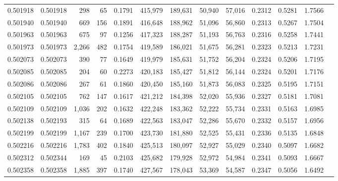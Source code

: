 \begin{tabular}{rrrrrrrrrrrrr}
0.501918 & 0.501918 &   298 &    65 &                                     0.1791 & 415,979 & 189,631 &  50,940 &  57,016 & 0.2312 & 0.5281 & 1.7566 \\
0.501940 & 0.501940 &   669 &   156 &                                     0.1891 & 416,648 & 188,962 &  51,096 &  56,860 & 0.2313 & 0.5267 & 1.7504 \\
0.501963 & 0.501963 &   675 &    97 &                                     0.1256 & 417,323 & 188,287 &  51,193 &  56,763 & 0.2316 & 0.5258 & 1.7441 \\
0.501973 & 0.501973 & 2,266 &   482 &                                     0.1754 & 419,589 & 186,021 &  51,675 &  56,281 & 0.2323 & 0.5213 & 1.7231 \\
0.502073 & 0.502073 &   390 &    77 &                                     0.1649 & 419,979 & 185,631 &  51,752 &  56,204 & 0.2324 & 0.5206 & 1.7195 \\
0.502085 & 0.502085 &   204 &    60 &                                     0.2273 & 420,183 & 185,427 &  51,812 &  56,144 & 0.2324 & 0.5201 & 1.7176 \\
0.502086 & 0.502086 &   267 &    61 &                                     0.1860 & 420,450 & 185,160 &  51,873 &  56,083 & 0.2325 & 0.5195 & 1.7151 \\
0.502105 & 0.502105 &   762 &   147 &                                     0.1617 & 421,212 & 184,398 &  52,020 &  55,936 & 0.2327 & 0.5181 & 1.7081 \\
0.502109 & 0.502109 & 1,036 &   202 &                                     0.1632 & 422,248 & 183,362 &  52,222 &  55,734 & 0.2331 & 0.5163 & 1.6985 \\
0.502138 & 0.502193 &   315 &    64 &                                     0.1689 & 422,563 & 183,047 &  52,286 &  55,670 & 0.2332 & 0.5157 & 1.6956 \\
0.502199 & 0.502199 & 1,167 &   239 &                                     0.1700 & 423,730 & 181,880 &  52,525 &  55,431 & 0.2336 & 0.5135 & 1.6848 \\
0.502216 & 0.502216 & 1,783 &   402 &                                     0.1840 & 425,513 & 180,097 &  52,927 &  55,029 & 0.2340 & 0.5097 & 1.6682 \\
0.502312 & 0.502344 &   169 &    45 &                                     0.2103 & 425,682 & 179,928 &  52,972 &  54,984 & 0.2341 & 0.5093 & 1.6667 \\
0.502358 & 0.502358 & 1,885 &   397 &                                     0.1740 & 427,567 & 178,043 &  53,369 &  54,587 & 0.2347 & 0.5056 & 1.6492 \\

\end{tabular}
